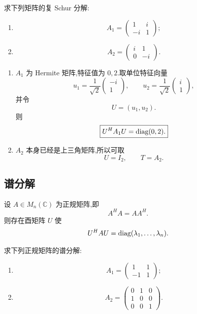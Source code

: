 \begin{example}
求下列矩阵的复 Schur 分解:
\begin{enumerate}
    \item
    \[
    A_1=
    \begin{pmatrix}
    1&i\\
    -i&1
    \end{pmatrix};
    \]
    \item
    \[
    A_2=
    \begin{pmatrix}
    i&1\\
    0&-i
    \end{pmatrix}.
    \]
\end{enumerate}
\end{example}
\exampleblank

\begin{solution}
\leavevmode
\begin{enumerate}
    \item $A_1$ 为 Hermite 矩阵,特征值为 $0,2$.取单位特征向量
    \[
    u_1=\dfrac1{\sqrt2}
    \begin{pmatrix}
    -i\\1
    \end{pmatrix},
    \qquad
    u_2=\dfrac1{\sqrt2}
    \begin{pmatrix}
    i\\1
    \end{pmatrix},
    \]
    并令
    \[
    U=(u_1,u_2).
    \]
    则
    \[
    \boxed{
    U^HA_1U=\operatorname{diag}(0,2).
    }
    \]

    \item $A_2$ 本身已经是上三角矩阵,所以可取
    \[
    \boxed{U=I_2,\qquad T=A_2}.
    \]
\end{enumerate}
\end{solution}


\subsection{谱分解}

\begin{theorem}[\marktwostar]
设 $A\in M_n(\mathbb{C})$ 为正规矩阵,即
\[
A^HA=AA^H.
\]
则存在酉矩阵 $U$ 使
\[
U^HAU
=
\operatorname{diag}(\lambda_1,\ldots,\lambda_n).
\]
\end{theorem}


\begin{example}
求下列正规矩阵的谱分解:
\begin{enumerate}
    \item
    \[
    A_1=
    \begin{pmatrix}
    1&1\\
    -1&1
    \end{pmatrix};
    \]
    \item
    \[
    A_2=
    \begin{pmatrix}
    0&1&0\\
    1&0&0\\
    0&0&1
    \end{pmatrix}.
    \]
\end{enumerate}
\end{example}
\exampleblank

